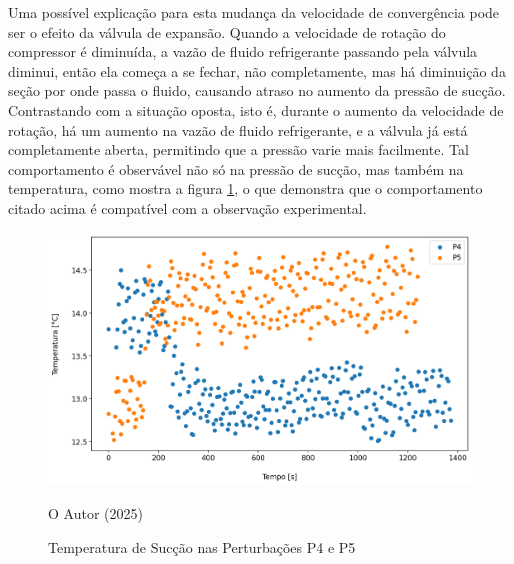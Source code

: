 Uma possível explicação para esta mudança da velocidade de convergência pode ser o efeito da válvula de expansão. Quando a velocidade de rotação do compressor é diminuída, a vazão de fluido refrigerante passando pela válvula diminui, então ela começa a se fechar, não completamente, mas há diminuição da seção por onde passa o fluido, causando atraso no aumento da pressão de sucção. Contrastando com a situação oposta, isto é, durante o aumento da velocidade de rotação, há um aumento na vazão de fluido refrigerante, e a válvula já está completamente aberta, permitindo que a pressão varie mais facilmente. Tal comportamento é observável não só na pressão de sucção, mas também na temperatura, como mostra a figura \ref{fig:TempSucçãoSubidaeDescida}, o que demonstra que o comportamento citado acima é compatível com a observação experimental.
\newpage
\begin{figure}[h]
    \centering
    \includegraphics[width=1\linewidth]{FigurasdoTexto/Temperatura de Sucção.png}
    \caption{Temperatura de Sucção  nas Perturbações P4 e P5}
    \label{fig:TempSucçãoSubidaeDescida}
    {\footnotesize O Autor (2025)}
\end{figure}


